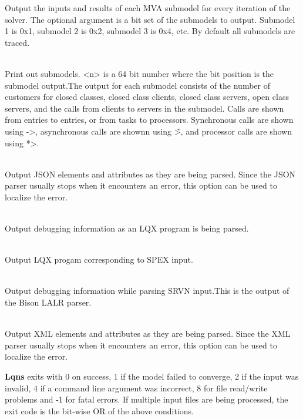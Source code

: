 \begin{description}
Output the inputs and results of each MVA submodel for every iteration of the solver.
The optional argument is a bit set of the submodels to output.  Submodel 1 is 0x1, 
submodel 2 is 0x2, submodel 3 is 0x4, etc.  By default all submodels are traced.
\item[\longopt{debug-submodels}]~\\
Print out submodels. <n> is a 64 bit number where the bit position is the submodel output.The output for each submodel consists of the number of customers for closed classes, closed class clients, 
closed class servers, open class servers, and the calls from clients to servers in the submodel.
Calls are shown from entries to entries, or from tasks to processors.
Synchronous calls are shown using ->, 
asynchronous calls are shownn using \~>, and 
processor calls are shown using *>.
\item[\longopt{debug-json}]~\\
Output JSON elements and attributes as they are being parsed.   Since the JSON parser usually stops when it encounters an error,
this option can be used to localize the error.
\item[\longopt{debug-lqx}]~\\
Output debugging information as an LQX program is being parsed.
\item[\longopt{debug-spex}]~\\
Output LQX progam corresponding to SPEX input.
\item[\longopt{debug-srvn}]~\\
Output debugging information while parsing SRVN input.This is the output of the Bison LALR parser.
\item[\longopt{debug-xml}]~\\
Output XML elements and attributes as they are being parsed.
Since the XML parser usually stops when it encounters an error,
this option can be used to localize the error.
\end{description}


\textbf{Lqns} exits with 0 on success, 1 if the model failed to converge,
2 if the input was invalid, 4 if a command line argument was
incorrect, 8 for file read/write problems and -1 for fatal errors.  If
multiple input files are being processed, the exit code is the
bit-wise OR of the above conditions.
